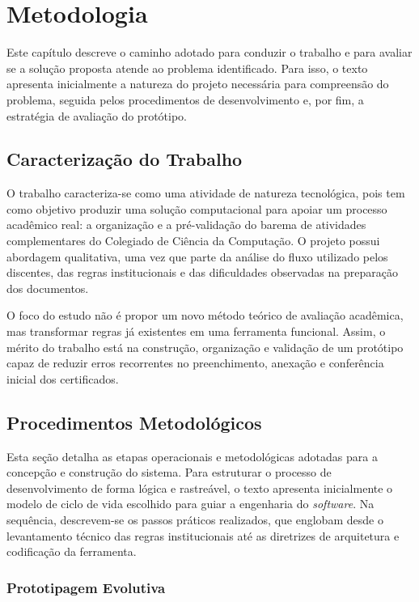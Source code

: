 \chapter{Metodologia}
\label{cap:metodologia}

Este capítulo descreve o caminho adotado para conduzir o trabalho e para avaliar se a solução proposta atende ao problema identificado. Para isso, o texto apresenta inicialmente a natureza do projeto necessária para compreensão do problema, seguida pelos procedimentos de desenvolvimento e, por fim, a estratégia de avaliação do protótipo.

\section{Caracterização do Trabalho}

O trabalho caracteriza-se como uma atividade de natureza tecnológica, pois tem como objetivo produzir uma solução computacional para apoiar um processo acadêmico real: a organização e a pré-validação do barema de atividades complementares do Colegiado de Ciência da Computação. O projeto possui abordagem qualitativa, uma vez que parte da análise do fluxo utilizado pelos discentes, das regras institucionais e das dificuldades observadas na preparação dos documentos.

O foco do estudo não é propor um novo método teórico de avaliação acadêmica, mas transformar regras já existentes em uma ferramenta funcional. Assim, o mérito do trabalho está na construção, organização e validação de um protótipo capaz de reduzir erros recorrentes no preenchimento, anexação e conferência inicial dos certificados.

\section{Procedimentos Metodológicos}\label{sec:procedimentos} 

Esta seção detalha as etapas operacionais e metodológicas adotadas para a concepção e construção do sistema. Para estruturar o processo de desenvolvimento de forma lógica e rastreável, o texto apresenta inicialmente o modelo de ciclo de vida escolhido para guiar a engenharia do \textit{software}. Na sequência, descrevem-se os passos práticos realizados, que englobam desde o levantamento técnico das regras institucionais até as diretrizes de arquitetura e codificação da ferramenta.

\subsection{Prototipagem Evolutiva}

